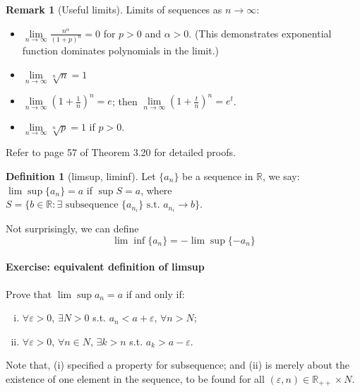 \documentclass[12pt]{article}
\newcommand{\R}{{\mathbb R}}
\theoremstyle{definition}
\newtheorem{definition}[theorem]{Definition}
\newtheorem{remark}[theorem]{Remark}
\theoremstyle{plain}
\begin{document}
\begin{remark}
    [Useful limits] Limits of sequences as $n \to \infty$:
    \begin{itemize}
        \item $\underset{n\to\infty}  \lim \frac{n^\alpha}{(1+p)^n} = 0$ for $p 
            > 0$ and $\alpha> 0$. (This demonstrates exponential function 
            dominates polynomials in the limit.)
        \item $\underset{n\to\infty} \lim \sqrt[n]{n} =  1$
        \item $\underset{n\to\infty} \lim \left( 1 + \frac{1}{n} \right)^n = e$; then 
            $\underset{n\to\infty} \lim \left( 1 + \frac{t}{n} \right)^n = e^t$.
        \item $\underset{n\to\infty} \lim \sqrt[n]{p} = 1$ if $p  > 0$.
    \end{itemize}

    Refer to page 57 of \cite{rudin1976principles} Theorem 3.20 for detailed 
    proofs.
\end{remark}

\begin{definition}
    [limsup, liminf]
    Let $\{a_n\}$ be a sequence in $\R$, we say: 
    $
        \lim\sup \{a_n\} = a
    $
    if $\sup S = a$, where $S = \{ b \in \R : \exists \text{ subsequence } 
    \{a_{n_i}\} \text{ s.t. } a_{n_i} \to b\}$.

    Not surprisingly, we can define 
    \[
        \lim\inf \{ a_n \} = - \lim \sup \{ - a_n\}
    \]
\end{definition}

\paragraph{Exercise: equivalent definition of limsup} Prove that $\lim\sup a_n = 
a$ if and only if: 
\begin{enumerate}[(i)]
    \item $\forall \varepsilon > 0$, $\exists N > 0$ s.t. $a_n < a + 
        \varepsilon$, $\forall n > N$;
    \item $\forall \varepsilon > 0$, $\forall n \in N$, $\exists k > n$ s.t. 
        $a_k > a - \varepsilon$.
\end{enumerate}
Note that, (i) specified a property for subsequence; and (ii) is merely about 
the existence of one element in the sequence, to be found for all $(\varepsilon, 
n) \in \R_{++} \times N$.
\end{document}
